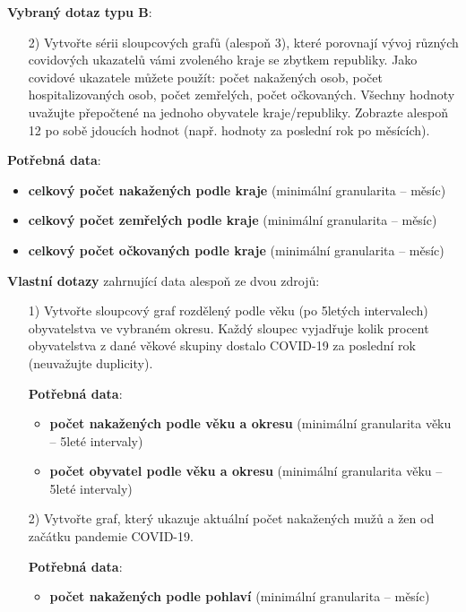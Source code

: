 \documentclass[12pt]{article}
\begin{document}
\hspace{1cm}

\textbf{Vybraný dotaz typu B}:
\begin{itemize}
    \item[2)] Vytvořte sérii sloupcových grafů (alespoň 3), které porovnají vývoj různých covidových ukazatelů vámi zvoleného kraje se zbytkem republiky. Jako covidové ukazatele můžete použít: počet nakažených osob, počet hospitalizovaných osob, počet zemřelých, počet očkovaných. Všechny hodnoty uvažujte přepočtené na jednoho obyvatele kraje/republiky. Zobrazte alespoň 12 po sobě jdoucích hodnot (např. hodnoty za poslední rok po měsících).
\end{itemize}

    \item[] \textbf{Potřebná data}:
    \begin{itemize}
        \item \textbf{celkový počet nakažených podle kraje} (minimální granularita -- měsíc)
        \item \textbf{celkový počet zemřelých podle kraje} (minimální granularita -- měsíc)
        \item \textbf{celkový počet očkovaných podle kraje} (minimální granularita -- měsíc)
    \end{itemize}

\hspace{1cm}

\textbf{Vlastní dotazy} zahrnující data alespoň ze dvou zdrojů:
\begin{itemize}
    \item[1)] Vytvořte sloupcový graf rozdělený podle věku (po 5letých intervalech) obyvatelstva ve vybraném okresu. Každý sloupec vyjadřuje kolik procent obyvatelstva z dané věkové skupiny dostalo COVID-19 za poslední rok (neuvažujte duplicity).
    
    \item[] \textbf{Potřebná data}:
    \begin{itemize}
        \item \textbf{počet nakažených podle věku a okresu} (minimální granularita věku -- 5leté intervaly)
        \item \textbf{počet obyvatel podle věku a okresu} (minimální granularita věku -- 5leté intervaly)
    \end{itemize}
    
    \item[2)] Vytvořte graf, který ukazuje aktuální počet nakažených mužů a žen od začátku pandemie COVID-19.
    
    \item[] \textbf{Potřebná data}:
    \begin{itemize}
        \item \textbf{počet nakažených podle pohlaví } (minimální granularita -- měsíc)
    \end{itemize}
\end{itemize}
\end{document}
